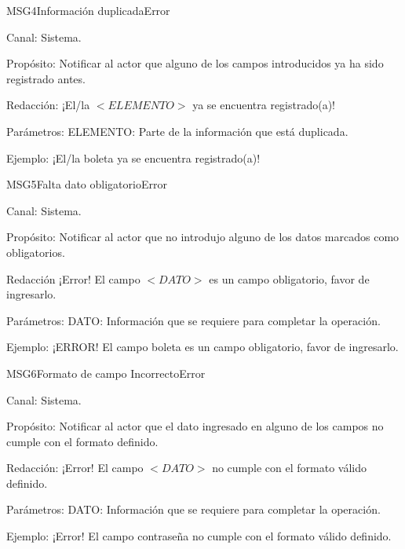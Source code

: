 \begin{mensaje}{MSG4}{Información duplicada}{Error}
	\item[Canal:] Sistema.
    \item[Propósito:] Notificar al actor que alguno de los campos introducidos ya ha sido registrado antes.
    \item[Redacción:] ¡El/la $<ELEMENTO>$ ya se encuentra registrado(a)!
    \item[Parámetros:] ELEMENTO: Parte de la información que está duplicada.
    \item[Ejemplo:] ¡El/la boleta ya se encuentra registrado(a)!
\end{mensaje}

\begin{mensaje}{MSG5}{Falta dato obligatorio}{Error}
	\item[Canal:] Sistema.
	\item[Propósito:] Notificar al actor que no introdujo alguno de los datos marcados como obligatorios. 
	\item[Redacción ] ¡Error! El campo $<DATO>$ es un campo obligatorio, favor de ingresarlo.
	\item[Parámetros:] DATO: Información que se requiere para completar la operación.
	\item[Ejemplo:] ¡ERROR! El campo boleta es un campo obligatorio, favor de ingresarlo.
\end{mensaje}

\begin{mensaje}{MSG6}{Formato de campo Incorrecto}{Error}
	\item[Canal:] Sistema.
	\item[Propósito:] Notificar al actor que el dato ingresado en alguno de los campos no 
	cumple con el formato definido.
	\item[Redacción:] ¡Error! El campo $<DATO>$ no cumple con el formato válido definido.
	\item[Parámetros:] DATO: Información que se requiere para completar la operación.
	\item[Ejemplo:] ¡Error! El campo contraseña no cumple con el formato válido definido.
\end{mensaje}

